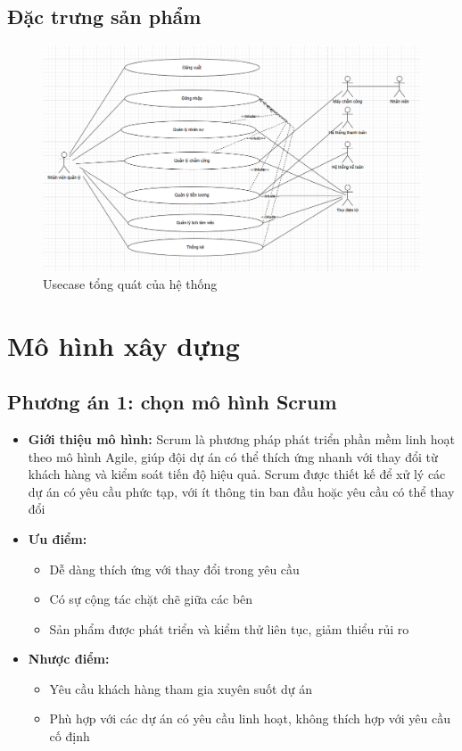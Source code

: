 \subsection{Đặc trưng sản phẩm}
\begin{figure}[H]
    \centering
    \includegraphics[width=\textwidth]{images/usecase.png}
    \caption{Usecase tổng quát của hệ thống}
    \label{fig:usecase-tong-quat}
\end{figure}

\section{Mô hình xây dựng}
\subsection{Phương án 1: chọn mô hình Scrum}
\begin{itemize}
    \item \textbf{Giới thiệu mô hình:} Scrum là phương pháp phát triển phần mềm linh hoạt theo mô hình Agile, giúp đội dự án có thể thích ứng nhanh với thay đổi từ khách hàng và kiểm soát tiến độ hiệu quả. Scrum được thiết kế để xử lý các dự án có yêu cầu phức tạp, với ít thông tin ban đầu hoặc yêu cầu có thể thay đổi
    \item \textbf{Ưu điểm:}
\begin{itemize}
    \item Dễ dàng thích ứng với thay đổi trong yêu cầu
    \item Có sự cộng tác chặt chẽ giữa các bên
    \item Sản phẩm được phát triển và kiểm thử liên tục, giảm thiểu rủi ro
\end{itemize}
\item \textbf{Nhược điểm:}
\begin{itemize}
    \item Yêu cầu khách hàng tham gia xuyên suốt dự án
    \item Phù hợp với các dự án có yêu cầu linh hoạt, không thích hợp với yêu cầu cố định
\end{itemize}
\end{itemize}
